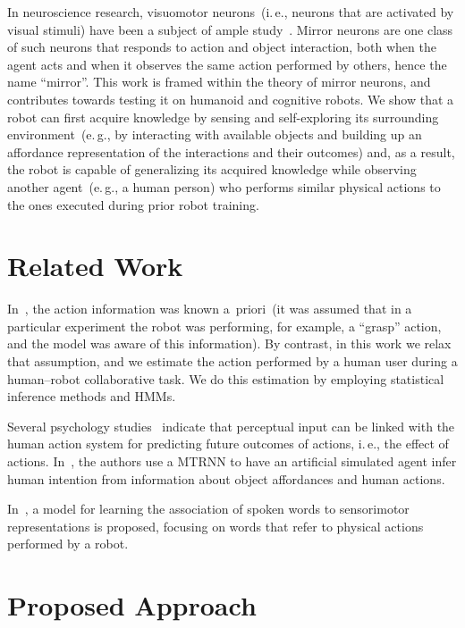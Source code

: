\documentclass[a4paper]{article}
\newcommand{\eg}{e.\,g.}
\newcommand{\ie}{i.\,e.}
\newcommand{\hr}{human--robot}
\begin{document}
In neuroscience research, visuomotor neurons~(\ie, neurons that are activated by visual stimuli) have been a subject of ample study~\cite{rizzolatti:2001:nrn}. Mirror neurons are one class of such neurons that responds to action and object interaction, both when the agent acts and when it observes the same action performed by others, hence the name ``mirror''. This work is framed within the theory of mirror neurons, and contributes towards testing it on humanoid and cognitive robots. We show that a robot can first acquire knowledge by sensing and self-exploring its surrounding environment~(\eg, by interacting with available objects and building up an affordance representation of the interactions and their outcomes) and, as a result, the robot is capable of generalizing its acquired knowledge while observing another agent~(\eg, a human person) who performs similar physical actions to the ones executed during prior robot training.

\section{Related Work}

In~\cite{salvi:2012:smcb}, the action information was known a~priori~(it was assumed that in a particular experiment the robot was performing, for example, a ``grasp'' action, and the model was aware of this information). By contrast, in this work we relax that assumption, and we estimate the action performed by a human user during a \hr{} collaborative task. We do this estimation by employing statistical inference methods and \acp{HMM}.

Several psychology studies~\cite{aglioti:2008:basketball,knoblich:2001:psychsci} indicate that perceptual input can be linked with the human action system for predicting future outcomes of actions, \ie, the effect of actions. In~\cite{kim:2017:nn}, the authors use a \ac{MTRNN} to have an artificial simulated agent infer human intention from information about object affordances and human actions.

In~\cite{stramandinoli:2016:icdl}, a model for learning the association of spoken words to sensorimotor representations is proposed, focusing on words that refer to physical actions performed by a robot.

\section{Proposed Approach}
\end{document}
